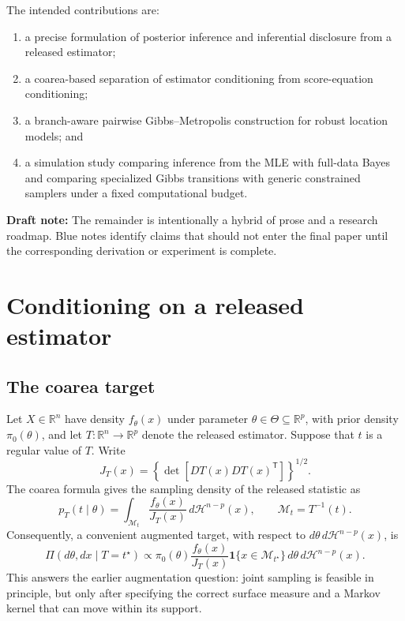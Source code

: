 \documentclass[smallextended,natbib,runningheads]{svjour3}
\newcommand{\draftnote}[1]{\textcolor{blue!70!black}{\textbf{Draft note:} #1}}
\newcommand{\R}{\mathbb{R}}
\newcommand{\Haus}{\mathcal{H}}
\begin{document}
The intended contributions are:
\begin{enumerate}
  \item a precise formulation of posterior inference and inferential disclosure
  from a released estimator;
  \item a coarea-based separation of estimator conditioning from
  score-equation conditioning;
  \item a branch-aware pairwise Gibbs--Metropolis construction for robust
  location models; and
  \item a simulation study comparing inference from the MLE with full-data
  Bayes and comparing specialized Gibbs transitions with generic constrained
  samplers under a fixed computational budget.
\end{enumerate}

\draftnote{The remainder is intentionally a hybrid of prose and a research
roadmap.  Blue notes identify claims that should not enter the final paper
until the corresponding derivation or experiment is complete.}

\section{Conditioning on a released estimator}
\label{sec:target}

\subsection{The coarea target}

Let $X\in\R^n$ have density $f_\theta(x)$ under parameter
$\theta\in\Theta\subseteq\R^p$, with prior density $\pi_0(\theta)$, and let
$T:\R^n\to\R^p$ denote the released estimator.  Suppose that $t$ is a regular
value of $T$.  Write
\[
  J_T(x)=\left\{\det[D T(x)D T(x)^\mathsf T]\right\}^{1/2}.
\]
The coarea formula gives the sampling density of the released statistic as
\begin{equation}
 p_T(t\mid\theta)
 =\int_{\mathcal M_t}\frac{f_\theta(x)}{J_T(x)}
 \,d\Haus^{n-p}(x),
 \qquad \mathcal M_t=T^{-1}(t).
 \label{eq:coarea_likelihood}
\end{equation}
Consequently, a convenient augmented target, with respect to
$d\theta\,d\Haus^{n-p}(x)$, is
\begin{equation}
 \Pi(d\theta,dx\mid T=t^\star)
 \propto
 \pi_0(\theta)\frac{f_\theta(x)}{J_T(x)}
 \mathbf 1\{x\in\mathcal M_{t^\star}\}
 \,d\theta\,d\Haus^{n-p}(x).
 \label{eq:augmented_exact_target}
\end{equation}
This answers the earlier augmentation question: joint sampling is feasible in
principle, but only after specifying the correct surface measure and a Markov
kernel that can move within its support.
\end{document}
